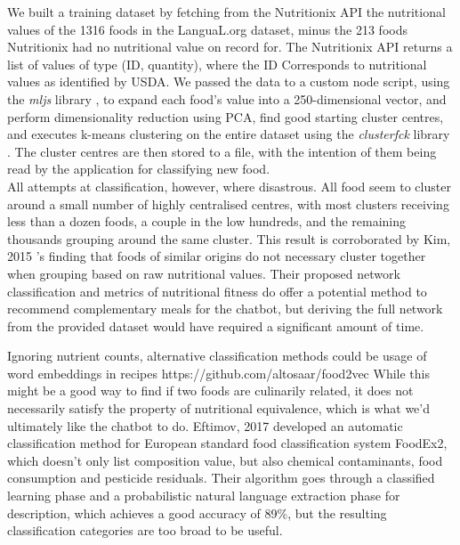 We built a training dataset by fetching from the Nutritionix API the nutritional values of the 1316 foods in the LanguaL.org dataset, minus the 213 foods Nutritionix had no nutritional value on record for. The Nutritionix API returns a list of values of type (ID, quantity), where the ID Corresponds to nutritional values as identified by USDA. We passed the data to a custom node script, using the \textit{mljs} library \cite{}, to expand each food's value into a 250-dimensional vector, and perform dimensionality reduction using PCA\cite{Ding2004}, find good starting cluster centres, and executes k-means clustering on the entire dataset using the \textit{clusterfck} library \cite{clusterfck}. The cluster centres are then stored to a file, with the intention of them being read by the application for classifying new food. \\
All attempts at classification, however, where disastrous. All food seem to cluster around a small number of highly centralised centres, with most clusters receiving less than a dozen foods, a couple in the low hundreds, and the remaining thousands grouping around the same cluster. This result is corroborated by Kim, 2015 \cite{Kim2015a}'s finding that foods of similar origins do not necessary cluster together when grouping based on raw nutritional values. Their proposed network classification and metrics of nutritional fitness do offer a potential method to recommend complementary meals for the chatbot, but deriving the full network from the provided dataset would have required a significant amount of time.

Ignoring nutrient counts, alternative classification methods could be usage of word embeddings in recipes https://github.com/altosaar/food2vec While this might be a good way to find if two foods are culinarily related, it does not necessarily satisfy the property of nutritional equivalence, which is what we'd ultimately like the chatbot to do.
Eftimov, 2017 \cite{Eftimov2017} developed an automatic classification method for European standard food classification system FoodEx2, which doesn't only list composition value, but also chemical contaminants, food consumption and pesticide residuals. Their algorithm goes through a classified learning phase and a probabilistic natural language extraction phase for description, which achieves a good accuracy of 89\%, but the resulting classification categories are too broad to be useful.


